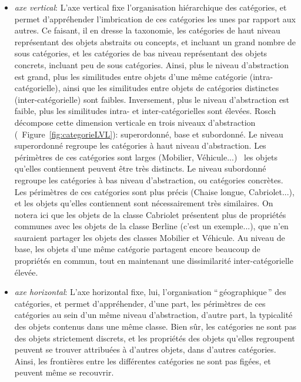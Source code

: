 \begin{itemize}
\item \textit{axe vertical}: L'axe vertical fixe l'organisation hiérarchique des catégories, et permet d'appréhender l'imbrication de ces catégories les unes par rapport aux autres. Ce faisant, il en dresse la taxonomie, les catégories de haut niveau représentant des objets abstraits ou concepts, et incluant un grand nombre de sous catégories, et les catégories de bas niveau représentant des objets concrets, incluant peu de sous catégories. Ainsi, plus le niveau d'abstraction est grand, plus les similitudes entre objets d'une même catégorie (intra-catégorielle), ainsi que les similitudes entre objets de catégories distinctes (inter-catégorielle) sont faibles. Inversement, plus le niveau d'abstraction est faible, plus les similitudes intra- et inter-catégorielles sont élevées. Rosch décompose cette dimension verticale en trois niveaux d'abstraction (\cf~Figure~\ref{fig:categorieLVL}): superordonné, base et subordonné. Le niveau superordonné regroupe les catégories à haut niveau d'abstraction. Les périmètres de ces catégories sont larges (Mobilier, Véhicule...) \ie~les objets qu'elles contiennent peuvent être très distincts. Le niveau subordonné regroupe les catégories à bas niveau d'abstraction, ou catégories concrètes. Les périmètres de ces catégories sont plus précis (Chaise longue, Cabriolet...), et les objets qu'elles contiennent sont nécessairement très similaires. On notera ici que les objets de la classe Cabriolet présentent plus de propriétés communes avec les objets de la classe Berline (c'est un exemple...), que n'en sauraient partager les objets des classes Mobilier et Véhicule. Au niveau de base, les objets d'une même catégorie partagent encore beaucoup de propriétés en commun, tout en maintenant une dissimilarité inter-catégorielle élevée.
\item \textit{axe horizontal}: L'axe horizontal fixe, lui, l'organisation ``\,géographique\,'' des catégories, et permet d'appréhender, d'une part, les périmètres de ces catégories au sein d'un même niveau d'abstraction, d'autre part, la typicalité des objets contenus dans une même classe. Bien sûr, les catégories ne sont pas des objets strictement discrets, et les propriétés des objets qu'elles regroupent peuvent se trouver attribuées à d'autres objets, dans d'autres catégories. Ainsi, les frontières entre les différentes catégories ne sont pas figées, et peuvent même se recouvrir.
\end{itemize}

